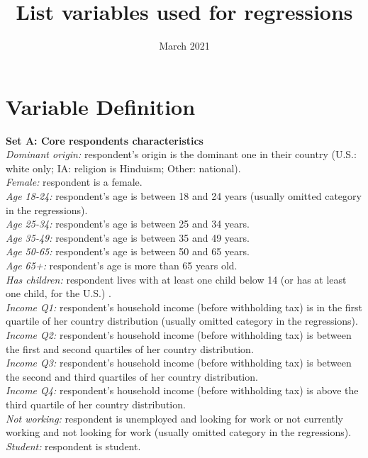 \documentclass{article}
\title{List variables used for regressions}
\date{March 2021}
\begin{document}
\maketitle


\section{Variable Definition \label{app-sec-variables}}


\medskip
\noindent \textbf{Set A: Core respondents characteristics}\\
\textit{Dominant origin:} respondent's origin is the dominant one in their country (U.S.: white only; IA: religion is Hinduism; Other: national).\\
\textit{Female:} respondent is a female.\\
\textit{Age 18-24:} respondent's age is between 18 and 24 years (usually omitted category in the regressions).\\ 
\textit{Age 25-34:} respondent's age is between 25 and 34 years.\\
\textit{Age 35-49:} respondent's age is between 35 and 49 years.\\
\textit{Age 50-65:} respondent's age is between 50 and 65 years.\\
\textit{Age 65+:} respondent's age is more than 65 years old.\\
\textit{Has children:} respondent lives with at least one child below 14 (or has at least one child, for the U.S.) .\\
\textit{Income Q1:} respondent's household income (before withholding tax) is in the first quartile of her country distribution (usually omitted category in the regressions).\\
\textit{Income Q2:} respondent's household income (before withholding tax) is between the first and second quartiles of her country distribution.\\
\textit{Income Q3:} respondent's household income (before withholding tax) is between the second and third quartiles of her country distribution.\\
\textit{Income Q4:} respondent's household income (before withholding tax) is above the third quartile of her country distribution.\\
\textit{Not working:} respondent is unemployed and looking for work or not currently working and not looking for work (usually omitted category in the regressions). \\
\textit{Student:} respondent is student. \\
\end{document}
